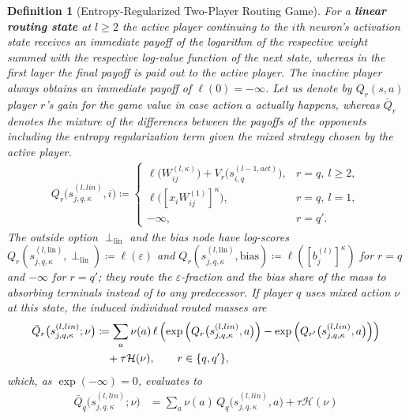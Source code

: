 \documentclass[twoside]{article}
\newcommand{\1}{\mathbf{1}}
\newtheorem{definition}{Definition}
\begin{document}
\begin{definition}[Entropy-Regularized Two-Player Routing Game]
For a \textbf{linear routing state} at $l \geq 2$ the active player continuing to the $i$th
neuron's activation state receives an immediate payoff of the logarithm of the respective weight
summed with the respective log-value function of the next state, whereas in the first layer the
final payoff is paid out to the active player. The inactive player always obtains an immediate
payoff of $\ell(0) = -\infty$. Let us denote by $Q_r(s, a)$ player $r$'s gain for the game value in
case action $a$ actually happens, whereas $\bar Q_r$ denotes the mixture of the differences between
the payoffs of the opponents including the entropy regularization term given the mixed strategy
chosen by the active player.
\begin{align}\label{eq:routing-linear-action}
    Q_r \bigl( s_{j,q,\kappa}^{(l, lin)}, i \bigr)
    \coloneqq
    \begin{cases}
        \ell\!\bigl(W_{ij}^{(l,\kappa)}\bigr) + V_r\bigl(s_{i,q}^{(l-1, act)}\bigr), & r=q,\ l \ge 2,\\[0.35em]
        \ell\!\bigl([x_iW_{ij}^{(1)}]^\kappa\bigr), & r=q,\ l = 1,\\[0.35em]
        -\infty, & r=q'.
    \end{cases}
\end{align}
The outside option $\perp_{\mathrm{lin}}$ and the bias node have log-scores
$Q_r(s_{j,q,\kappa}^{(l,\mathrm{lin})}, \perp_{\mathrm{lin}}) \coloneqq \ell(\varepsilon)$ and
$Q_r(s_{j,q,\kappa}^{(l,\mathrm{lin})}, \mathrm{bias}) \coloneqq \ell([b_j^{(l)}]^\kappa)$ for $r =
    q$ and $-\infty$ for $r = q'$; they route the $\varepsilon$-fraction and the bias share of the mass
to absorbing terminals instead of to any predecessor.
If player $q$ uses mixed action $\nu$ at this state, the induced \emph{individual routed masses}
are
\begin{align}\label{eq:optimal-linear}
    \bar Q_r \bigl( s_{j,q,\kappa}^{(l, lin)};\nu \bigr)
    &\coloneqq
    \sum_a \nu(a)\, \ell \left( \exp \left( Q_r \bigl( s_{j,q,\kappa}^{(l, lin)}, a \bigr) \right) -
    \exp \left( Q_{r'} \bigl( s_{j,q,\kappa}^{(l, lin)}, a \bigr) \right) \right) \notag\\
    &\quad + \tau \mathcal{H}(\nu),
    \qquad r \in \{q,q'\},
\end{align}
which, as $\exp(-\infty)=0$, evaluates to
\begin{align}
    \bar Q_q \bigl( s_{j,q,\kappa}^{(l, lin)};\nu \bigr)
    &=
    \sum_a \nu(a)\, Q_q \bigl( s_{j,q,\kappa}^{(l, lin)}, a \bigr)
    + \tau \mathcal{H}(\nu) \\

\end{align}
\end{definition}
\end{document}
